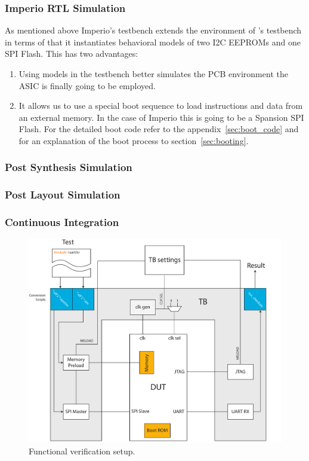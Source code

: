 \subsubsection{Imperio RTL Simulation}

As mentioned above Imperio's testbench extends the environment of \pulpino's testbench in terms of that it instantiates behavioral models of two I2C EEPROMs and one SPI Flash. This has two advantages:
\begin{enumerate}
    \item Using models in the testbench better simulates the PCB environment the ASIC is finally going to be employed.
    \item It allows us to use a special boot sequence to load instructions and data from an external memory. In the case of Imperio this is going to be a Spansion SPI Flash. For the detailed boot code refer to the appendix~\ref{sec:boot_code} and for an explanation of the boot process to section~\ref{sec:booting}.
\end{enumerate}


\subsubsection{Post Synthesis Simulation}
\subsubsection{Post Layout Simulation}


\subsubsection{Continuous Integration}
\begin{figure}[tb]
  \centering
  \includegraphics[width=\linewidth]{./figures/test_environment}
  \caption{Functional verification setup.}
  \label{fig:func_ver}
\end{figure}

